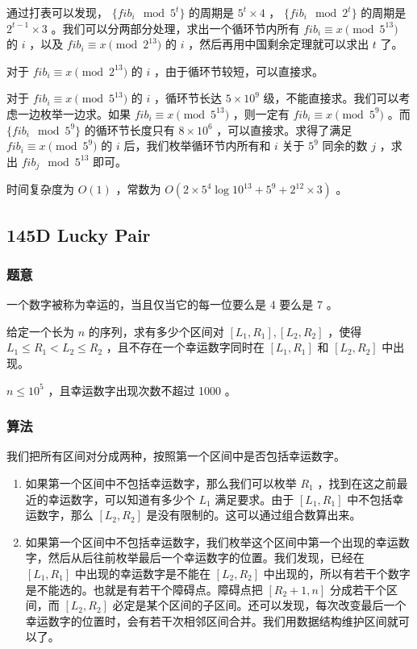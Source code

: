 \documentclass[11pt]{article}
\begin{document}
    通过打表可以发现， $\{fib_i \mod{5^{t}}\}$ 的周期是 $5^{t} \times 4$ ， $\{fib_i \mod{2^t}\}$ 的周期是 $2^{t - 1} \times 3$ 。我们可以分两部分处理，求出一个循环节内所有 $fib_i \equiv x \pmod{5^{13}}$ 的 $i$ ，以及 $fib_i \equiv x \pmod{2^{13}}$ 的 $i$ ，然后再用中国剩余定理就可以求出 $t$ 了。

    对于 $fib_i \equiv x \pmod{2^{13}}$ 的 $i$ ，由于循环节较短，可以直接求。

    对于 $fib_i \equiv x \pmod{5^{13}}$ 的 $i$ ，循环节长达 $5 \times 10^{9}$ 级，不能直接求。我们可以考虑一边枚举一边求。如果 $fib_i \equiv x \pmod{5^{13}}$ ，则一定有 $fib_i \equiv x \pmod{5^{9}}$ 。而 $\{fib_i \mod{5^9}\}$ 的循环节长度只有 $8 \times 10^6$ ，可以直接求。求得了满足 $fib_i \equiv x \pmod{5^9}$ 的 $i$ 后，我们枚举循环节内所有和 $i$ 关于 $5^9$ 同余的数 $j$ ，求出 $fib_j \mod{5^{13}}$ 即可。

    时间复杂度为 $O(1)$ ，常数为 $O(2 \times 5^{4} \log 10^{13} + 5^9 + 2^{12} \times 3)$ 。
\subsection{145D  Lucky Pair}
\label{sec-8-9}
\subsubsection{题意}
\label{sec-8-9-1}

    一个数字被称为幸运的，当且仅当它的每一位要么是 4 要么是 7 。

    给定一个长为 $n$ 的序列，求有多少个区间对 $[L_1, R_1], [L_2, R_2]$ ，使得 $L_1 \leq R_1 < L_2 \leq R_2$ ，且不存在一个幸运数字同时在 $[L_1, R_1]$ 和 $[L_2, R_2]$ 中出现。

    $n \leq 10^5$ ，且幸运数字出现次数不超过 1000 。
\subsubsection{算法}
\label{sec-8-9-2}

    我们把所有区间对分成两种，按照第一个区间中是否包括幸运数字。

\begin{enumerate}
\item 如果第一个区间中不包括幸运数字，那么我们可以枚举 $R_1$ ，找到在这之前最近的幸运数字，可以知道有多少个 $L_1$ 满足要求。由于 $[L_1, R_1]$ 中不包括幸运数字，那么 $[L_2, R_2]$ 是没有限制的。这可以通过组合数算出来。
\item 如果第一个区间中不包括幸运数字，我们枚举这个区间中第一个出现的幸运数字，然后从后往前枚举最后一个幸运数字的位置。我们发现，已经在 $[L_1, R_1]$ 中出现的幸运数字是不能在 $[L_2, R_2]$ 中出现的，所以有若干个数字是不能选的。也就是有若干个障碍点。障碍点把 $[R_2 + 1, n]$ 分成若干个区间，而 $[L_2, R_2]$ 必定是某个区间的子区间。还可以发现，每次改变最后一个幸运数字的位置时，会有若干次相邻区间合并。我们用数据结构维护区间就可以了。
\end{enumerate}
\end{document}
